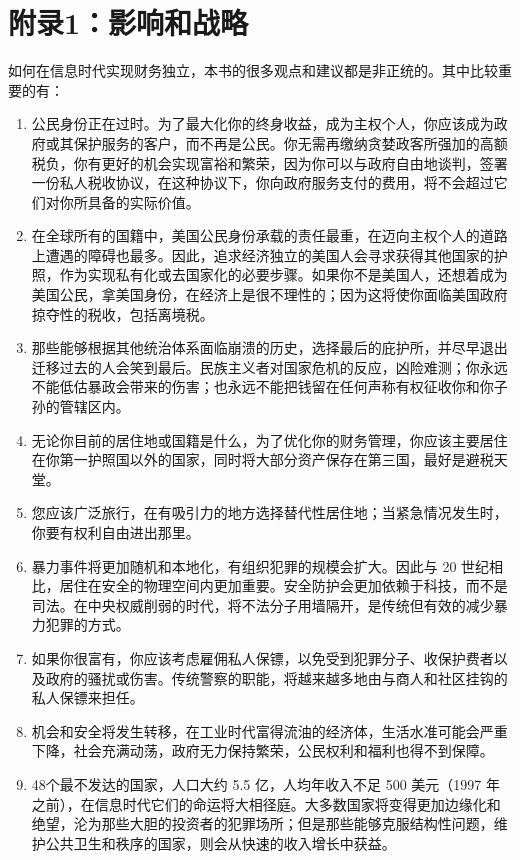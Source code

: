 \thispagestyle{empty}
\chapter*{附录1：影响和战略}

如何在信息时代实现财务独立，本书的很多观点和建议都是非正统的。其中比较重要的有：

\begin{enumerate}
    \item 公民身份正在过时。为了最大化你的终身收益，成为主权个人，你应该成为政府或其保护服务的客户，而不再是公民。你无需再缴纳贪婪政客所强加的高额税负，你有更好的机会实现富裕和繁荣，因为你可以与政府自由地谈判，签署一份私人税收协议，在这种协议下，你向政府服务支付的费用，将不会超过它们对你所具备的实际价值。
    \item 在全球所有的国籍中，美国公民身份承载的责任最重，在迈向主权个人的道路上遭遇的障碍也最多。因此，追求经济独立的美国人会寻求获得其他国家的护照，作为实现私有化或去国家化的必要步骤。如果你不是美国人，还想着成为美国公民，拿美国身份，在经济上是很不理性的；因为这将使你面临美国政府掠夺性的税收，包括离境税。
    \item 那些能够根据其他统治体系面临崩溃的历史，选择最后的庇护所，并尽早退出迁移过去的人会笑到最后。民族主义者对国家危机的反应，凶险难测；你永远不能低估暴政会带来的伤害；也永远不能把钱留在任何声称有权征收你和你子孙的管辖区内。
    \item 无论你目前的居住地或国籍是什么，为了优化你的财务管理，你应该主要居住在你第一护照国以外的国家，同时将大部分资产保存在第三国，最好是避税天堂。
    \item 您应该广泛旅行，在有吸引力的地方选择替代性居住地；当紧急情况发生时，你要有权利自由进出那里。
    \item 暴力事件将更加随机和本地化，有组织犯罪的规模会扩大。因此与 20 世纪相比，居住在安全的物理空间内更加重要。安全防护会更加依赖于科技，而不是司法。在中央权威削弱的时代，将不法分子用墙隔开，是传统但有效的减少暴力犯罪的方式。
    \item 如果你很富有，你应该考虑雇佣私人保镖，以免受到犯罪分子、收保护费者以及政府的骚扰或伤害。传统警察的职能，将越来越多地由与商人和社区挂钩的私人保镖来担任。
    \item 机会和安全将发生转移，在工业时代富得流油的经济体，生活水准可能会严重下降，社会充满动荡，政府无力保持繁荣，公民权利和福利也得不到保障。
    \item 48个最不发达的国家，人口大约 5.5 亿，人均年收入不足 500 美元（1997 年之前），在信息时代它们的命运将大相径庭。大多数国家将变得更加边缘化和绝望，沦为那些大胆的投资者的犯罪场所；但是那些能够克服结构性问题，维护公共卫生和秩序的国家，则会从快速的收入增长中获益。

\end{enumerate}
